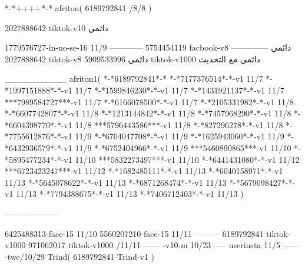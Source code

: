 *-*++++*-*
afriton(
6189792841 /8/8
)

2027888642 tiktok-v10
دائمي

1779576727-in-no-se-16 11/9
------------
5754454119 facbook-v8
دائمي
--------------
2027888642 tiktok-v8
دائمي
5909533996 tiktok-v1000
دائمي مع التحديث

__________
afriton1(
*-*6189792841*-*
*-*7177376514*-*-v1 11/7
*-*1997151888*-*-v1 11/7
*-*1599846230*-*-v1 11/7
*-*1431921137*-*-v1 11/7
***7989584727***-v1 11/7
*-*6166078500*-*-v1 11/7
*-*2105331982*-*-v1 11/8
*-*6607742807*-*-v1 11/8
*-*1213144842*-*-v1 11/8
*-*7457968290*-*-v1 11/8
*-*6604398770*-*-v1 11/8
***5796443586***-v1 11/8
*-*827296278*-*-v1 11/8
*-*7755612876*-*-v1 11/9
*-*6704047708*-*-v1 11/9
*-*1625943060*-*-v1 11/9
*-*6432936579*-*-v1 11/9
*-*6752404966*-*-v1 11/9
***5460890865***-v1 11/10
*-*5895477234*-*-v1 11/10
***5832273497***-v1 11/10
*-*6441431080*-*-v1 11/12
***6723423247***-v1 11/12
*-*1682485111*-*-v1 11/13
*-*6040158971*-*-v1 11/13
*-*5645078622*-*-v1 11/13
*-*6871268474*-*-v1 11/13
*-*5679098427*-*-v1 11/13
*-*7794388675*-*-v1 11/13
*-*7406712403*-*-v1 11/13
)

------
------------

6425488313-face-15 11/10
5560207210-face-15 11/11
---------
6189792841 tiktok-v1000
971062017 tiktok-v1000 /11/11
------
-v10-m 10/23
-----
userinsta 11/5
------
-twe/10/29
Trind(
6189792841-Trind-v1 
)
